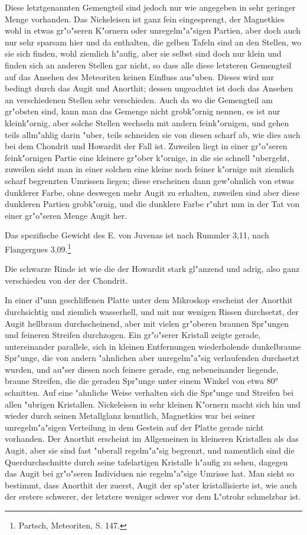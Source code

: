 \documentclass[a4paper, 11pt, oneside]{article}
\begin{document}
Diese letztgenannten Gemengteil sind jedoch nur wie angegeben in sehr geringer Menge vorhanden. Das Nickeleisen ist ganz fein eingesprengt, der Magnetkies wohl in etwas gr"o"seren K"ornern oder unregelm"a"sigen Partien, aber doch auch nur sehr sparsam hier und da enthalten, die gelben Tafeln sind an den Stellen, wo sie sich finden, wohl ziemlich h"aufig, aber sie selbst sind doch nur klein und finden sich an anderen Stellen gar nicht, so dass alle diese letzteren Gemengteil auf das Ansehen des Meteoriten keinen Einfluss aus"uben. Dieses wird nur bedingt durch das Augit und Anorthit; dessen ungeachtet ist doch das Ansehen an verschiedenen Stellen sehr verschieden. Auch da wo die Gemengteil am gr"obsten sind, kann man das Gemenge nicht grobk"ornig nennen, es ist nur kleink"ornig, aber solche Stellen wechseln mit andern feink"ornigen, und gehen teils allm"ahlig darin "uber, teils schneiden sie von diesen scharf ab, wie dies auch bei dem Chondrit und Howardit der Fall ist. Zuweilen liegt in einer gr"o"seren feink"ornigen Partie eine kleinere gr"ober k"ornige, in die sie schnell "ubergeht, zuweilen sieht man in einer solchen eine kleine noch feiner k"ornige mit ziemlich scharf begrenzten Umrissen liegen; diese erscheinen dann gew"ohnlich von etwas dunklerer Farbe, ohne deswegen mehr Augit zu erhalten, zuweilen sind aber diese dunkleren Partien grobk"ornig, und die dunklere Farbe r"uhrt nun in der Tat von einer gr"o"seren Menge Augit her.

Das spezifische Gewicht des E. von Juvenas ist nach Rummler 3,11, nach Flangergues 3,09.\footnote{Partsch, Meteoriten, S. 147.}

Die schwarze Rinde ist wie die der Howardit stark gl"anzend und adrig, also ganz verschieden von der der Chondrit.

In einer d"unn geschliffenen Platte unter dem Mikroskop erscheint der Anorthit durchsichtig und ziemlich wasserhell, und mit nur wenigen Rissen durchsetzt, der Augit hellbraun durchscheinend, aber mit vielen gr"oberen braunen Spr"ungen und feineren Streifen durchzogen. Ein gr"o"serer Kristall zeigte gerade, untereinander parallele, sich in kleinen Entfernungen wiederholende dunkelbraune Spr"unge, die von andern "ahnlichen aber unregelm"a"sig verlaufenden durchsetzt wurden, und au"ser diesen noch feinere gerade, eng nebeneinander liegende, braune Streifen, die die geraden Spr"unge unter einem Winkel von etwa 80° schnitten. Auf eine "ahnliche Weise verhalten sich die Spr"unge und Streifen bei allen "ubrigen Kristallen. Nickeleisen in sehr kleinen K"ornern macht sich hin und wieder durch seinen Metallglanz kenntlich, Magnetkies war bei seiner unregelm"a"sigen Verteilung in dem Gestein auf der Platte gerade nicht vorhanden. Der Anorthit erscheint im Allgemeinen in kleineren Kristallen als das Augit, aber sie sind fast "uberall regelm"a"sig begrenzt, und namentlich sind die Querdurchschnitte durch seine tafelartigen Kristalle h"aufig zu sehen, dagegen das Augit bei gr"o"seren Individuen nie regelm"a"sige Umrisse hat. Man sieht so bestimmt, dass Anorthit der zuerst, Augit der sp"ater kristallisierte ist, wie auch der erstere schwerer, der letztere weniger schwer vor dem L"otrohr schmelzbar ist.
\end{document}
